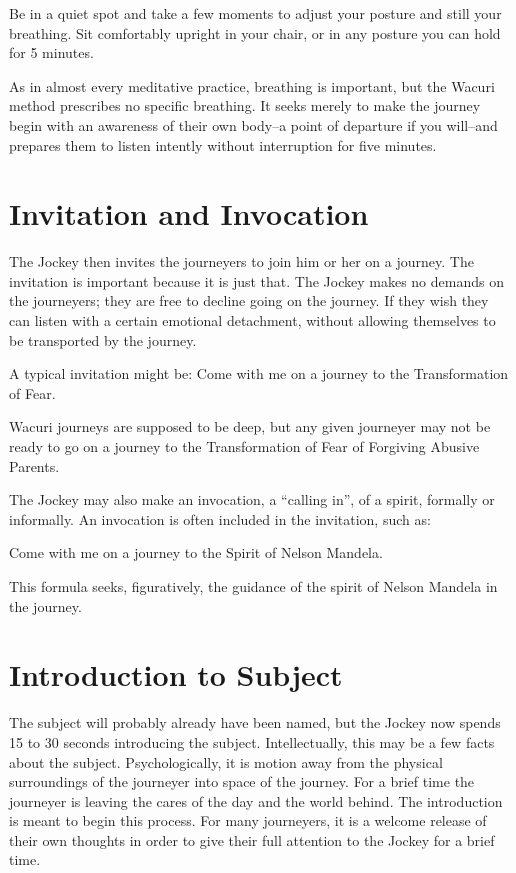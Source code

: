 \documentclass[12pt]{book}
\begin{document}
Be in a quiet spot and take a few moments to adjust your posture and still your breathing. Sit comfortably upright in your chair, or in any posture you can hold for 5 minutes.
					
As in almost every meditative practice, breathing is important, but the Wacuri method prescribes no specific breathing. It seeks merely to make the journey begin with an awareness of their own body–a point of departure if you will–and prepares them to listen intently without interruption for five minutes.
					
\section{Invitation and Invocation}
					
The Jockey then invites the journeyers to join him or her on a journey. The invitation is important because it is just that. The Jockey makes no demands on the journeyers; they are free to decline going on the journey. If they wish they can listen with a certain emotional detachment, without allowing themselves to be transported by the journey.
					
A typical invitation might be:
Come with me on a journey to the Transformation of Fear.
					
Wacuri journeys are supposed to be deep, but any given journeyer may not be ready to go on a journey to the Transformation of Fear of Forgiving Abusive Parents.
					
The Jockey may also make an invocation, a “calling in”, of a spirit, formally or informally. An invocation is often included in the invitation, such as:
					
Come with me on a journey to the Spirit of Nelson Mandela.
					
This formula seeks, figuratively, the guidance of the spirit of Nelson Mandela in the journey.

\section{Introduction to Subject}
					
The subject will probably already have been named, but the Jockey now spends 15 to 30 seconds introducing the subject. Intellectually, this may be a few facts about the subject. Psychologically, it is motion away from the physical surroundings of the journeyer into space of the journey. For a brief time the journeyer is leaving the cares of the day and the world behind. The introduction is meant to begin this process. For many journeyers, it is a welcome release of their own thoughts in order to give their full attention to the Jockey for a brief time.
					
\end{document}
